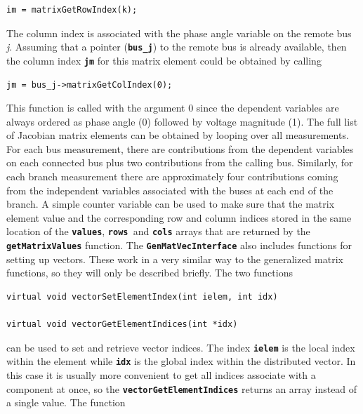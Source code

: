 \documentclass[12pt]{report} %
\begin{document}
{
\color{red}
\begin{Verbatim}[fontseries=b]
                im = matrixGetRowIndex(k);
\end{Verbatim}
}

The column index is associated with the phase angle variable on the remote bus \textit{j}. Assuming that a pointer (\texttt{\textbf{bus\_j}}) to the remote bus is already available, then the column index \texttt{\textbf{jm}} for this matrix element could be obtained by calling

{
\color{red}
\begin{Verbatim}[fontseries=b]
                jm = bus_j->matrixGetColIndex(0);
\end{Verbatim}
}

This function is called with the argument 0 since the dependent variables are
always ordered as phase angle (0) followed by voltage magnitude (1). The full list of Jacobian matrix elements can be obtained by looping over all measurements. For each bus measurement, there are contributions from the dependent variables on each connected bus plus two contributions from the calling bus. Similarly, for each branch measurement there are approximately four contributions coming from the independent variables associated with the buses at each end of the branch. A simple counter variable can be used to make sure that the matrix element value and the corresponding row and column indices stored in the same location of the \texttt{\textbf{values}}, \texttt{\textbf{rows }}and \texttt{\textbf{cols}} arrays that are returned by the \texttt{\textbf{getMatrixValues}} function.
The \texttt{\textbf{GenMatVecInterface}} also includes functions for setting up vectors. These work in a very similar way to the generalized matrix functions, so they will only be described briefly. The two functions

{
\color{red}
\begin{Verbatim}[fontseries=b]
virtual void vectorSetElementIndex(int ielem, int idx)

virtual void vectorGetElementIndices(int *idx)
\end{Verbatim}
}

can be used to set and retrieve vector indices. The index \texttt{\textbf{ielem}} is the local index within the element while \texttt{\textbf{idx}} is the global index within the distributed vector. In this case it is usually more convenient to get all indices associate with a component at once, so the \texttt{\textbf{vectorGetElementIndices}} returns an array instead of a single value. The function
\end{document}
